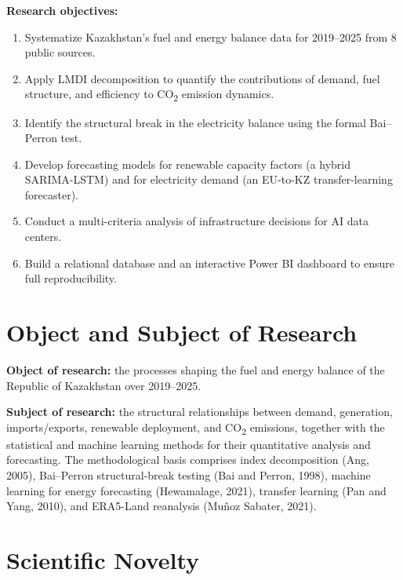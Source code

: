 \textbf{Research objectives:}
\begin{enumerate}[topsep=2pt, itemsep=1pt]
    \item Systematize Kazakhstan's fuel and energy balance data for 2019--2025 from 8 public sources.
    \item Apply LMDI decomposition to quantify the contributions of demand, fuel structure, and efficiency to CO\textsubscript{2} emission dynamics.
    \item Identify the structural break in the electricity balance using the formal Bai--Perron test.
    \item Develop forecasting models for renewable capacity factors (a hybrid SARIMA-LSTM) and for electricity demand (an EU-to-KZ transfer-learning forecaster).
    \item Conduct a multi-criteria analysis of infrastructure decisions for AI data centers.
    \item Build a relational database and an interactive Power BI dashboard to ensure full reproducibility.
\end{enumerate}

\section{Object and Subject of Research}
\label{sec:object}

\textbf{Object of research:} the processes shaping the fuel and energy balance of the Republic of Kazakhstan over 2019--2025.

\textbf{Subject of research:} the structural relationships between demand, generation, imports/exports, renewable deployment, and CO\textsubscript{2} emissions, together with the statistical and machine learning methods for their quantitative analysis and forecasting. The methodological basis comprises index decomposition (Ang, 2005), Bai--Perron structural-break testing (Bai and Perron, 1998), machine learning for energy forecasting (Hewamalage, 2021), transfer learning (Pan and Yang, 2010), and ERA5-Land reanalysis (Mu\~noz Sabater, 2021).

\section{Scientific Novelty}
\label{sec:novelty}

